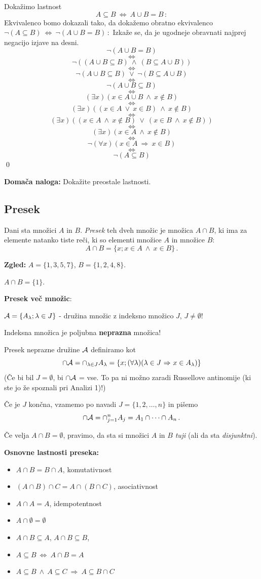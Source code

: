 \documentclass[11pt,paper=b5,DIV=13,headinclude,footinclude]{scrbook}
\def\ali {{~\vee~}}
\def\inn {{~\wedge~}}
\def\sledi {{~\Rightarrow~}}
\def\cee {{~\Leftrightarrow~}}
\begin{document}
\bigskip
Dokažimo lastnost
$$A\subseteq B\cee A\cup B = B\,:$$
\medskip
Ekvivalenco bomo dokazali tako, da dokažemo obratno ekvivalenco
$\neg(A\subseteq B)\cee \neg(A\cup B = B)\,:$
Izkaže se, da je ugodneje obravnati najprej negacijo izjave na desni.
$$\neg(A\cup B = B)$$
$$\cee$$
$$\neg((A\cup B \subseteq B)\inn (B \subseteq A\cup B))$$
$$\cee$$
$$\neg(A\cup B \subseteq B) \ali \neg(B \subseteq A\cup B) $$
$$\cee$$
$$\neg(A\cup B \subseteq B)$$
$$\cee$$
$$(\exists x)(x\in A\cup B\inn x\not\in B)$$
$$\cee$$
$$(\exists x)((x\in A \ali x\in B)\inn x\not\in B)$$
$$\cee$$
$$(\exists x)((x\in A \inn x\not\in B) \ali (x\in B \inn x\not\in B))$$
$$\cee$$
$$(\exists x)(x\in A \inn x\not\in B)$$
$$\cee$$
$$\neg(\forall x)(x\in A\sledi x\in B)$$
$$\cee$$
$$\neg(A\subseteq B)$$
\qed

\bigskip
\textbf{ Domača naloga:} Dokažite preostale lastnosti.
\bigskip

\subsection{Presek}
Dani sta množici $A$ in $B$. {\em Presek} teh dveh množic je množica $A\cap B$, ki ima za elemente natanko tiste reči, ki so elementi množice $A$ in množice $B$:
$$A\cap B = \{x; x\in A \inn x\in B\}\,.$$

\textbf{ Zgled:}
$A = \{1,3,5,7\}$, $B = \{1,2,4,8\}$.

$A\cap B = \{1\}$.

\medskip

\textbf{ Presek več množic}:

${\cal A} = \{A_\lambda; \lambda \in J\}$ - družina množic z indeksno množico $J$, $J\neq \emptyset$!

Indeksna množica je poljubna \textbf{ neprazna} množica!

Presek neprazne družine ${\cal A}$ definiramo kot
$$\cap {\cal A} = \cap_{\lambda \in J} A_\lambda = \{x;(\forall\lambda) (\lambda \in J\sledi x\in A_\lambda)\}$$
(Če bi bil $J = \emptyset$, bi $\cap {\cal A}$ = vse. To pa ni možno zaradi Russellove antinomije (ki ste jo že spoznali pri Analizi 1)!)

\medskip
Če je $J$ končna, vzamemo po navadi $J = \{1,2,\ldots, n\}$ in pišemo
$$\cap {\cal A} = \cap_{j = 1}^nA_j = A_1\cap\cdots\cap A_n\,.$$

Če velja
$A\cap B = \emptyset$, pravimo, da sta si množici $A$ in $B$ {\em tuji}
(ali da sta {\em disjunktni}).

\bigskip
\textbf{ Osnovne lastnosti preseka:}
\begin{itemize}
  \item $A\cap B = B\cap A$, komutativnost
  \item $(A\cap B)\cap C = A\cap (B\cap C)$, asociativnost
  \item $A\cap A = A$, idempotentnost
  \item $A\cap \emptyset = \emptyset$
  \item $A\cap B\subseteq A$, $A\cap B\subseteq B$,
  \item $A\subseteq B\cee A\cap B = A$
  \item $A\subseteq B\inn A\subseteq C\sledi A \subseteq B\cap C$
\end{itemize}
\end{document}
